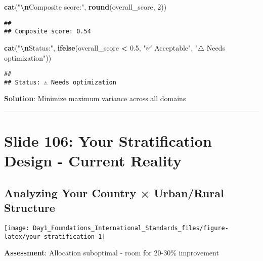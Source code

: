 \documentclass[
]{article}
\newenvironment{Shaded}{\begin{snugshade}}{\end{snugshade}}
\newcommand{\DecValTok}[1]{\textcolor[rgb]{0.00,0.00,0.81}{#1}}
\newcommand{\FloatTok}[1]{\textcolor[rgb]{0.00,0.00,0.81}{#1}}
\newcommand{\FunctionTok}[1]{\textcolor[rgb]{0.13,0.29,0.53}{\textbf{#1}}}
\newcommand{\NormalTok}[1]{#1}
\newcommand{\SpecialCharTok}[1]{\textcolor[rgb]{0.81,0.36,0.00}{\textbf{#1}}}
\newcommand{\StringTok}[1]{\textcolor[rgb]{0.31,0.60,0.02}{#1}}
\begin{document}
\begin{Shaded}
\begin{Highlighting}[]
\FunctionTok{cat}\NormalTok{(}\StringTok{"}\SpecialCharTok{\textbackslash{}n}\StringTok{Composite score:"}\NormalTok{, }\FunctionTok{round}\NormalTok{(overall\_score, }\DecValTok{2}\NormalTok{))}
\end{Highlighting}
\end{Shaded}

\begin{verbatim}
## 
## Composite score: 0.54
\end{verbatim}

\begin{Shaded}
\begin{Highlighting}[]
\FunctionTok{cat}\NormalTok{(}\StringTok{"}\SpecialCharTok{\textbackslash{}n}\StringTok{Status:"}\NormalTok{, }\FunctionTok{ifelse}\NormalTok{(overall\_score }\SpecialCharTok{\textless{}} \FloatTok{0.5}\NormalTok{, }\StringTok{"✅ Acceptable"}\NormalTok{, }\StringTok{"⚠️ Needs optimization"}\NormalTok{))}
\end{Highlighting}
\end{Shaded}

\begin{verbatim}
## 
## Status: ⚠️ Needs optimization
\end{verbatim}

\textbf{Solution}: Minimize maximum variance across all domains

\begin{center}\rule{0.5\linewidth}{0.5pt}\end{center}

\section{Slide 106: Your Stratification Design - Current
Reality}\label{slide-106-your-stratification-design---current-reality}

\subsection{Analyzing Your Country × Urban/Rural
Structure}\label{analyzing-your-country-urbanrural-structure}

\texttt{[image: Day1\_Foundations\_International\_Standards\_files/figure-latex/your-stratification-1]}

\textbf{Assessment}: Allocation suboptimal - room for 20-30\%
improvement
\end{document}
